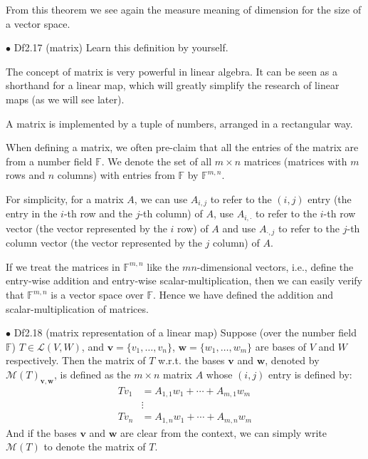 \documentclass{article}
\begin{document}
\begin{Rmk}{}
    From this theorem we see again the measure meaning of dimension for the size of a vector space.
\end{Rmk}

\begin{Df}{$\bullet$ Df2.17 (matrix)}
    Learn this definition by yourself.
\end{Df}

\begin{Rmk}{}
    \begin{compactenum}
        \item The concept of matrix is very powerful in linear algebra. It can be seen as a shorthand for a linear map, which will greatly simplify the research of linear maps (as we will see later). 
        \item A matrix is implemented by a tuple of numbers, arranged in a rectangular way.
        \item When defining a matrix, we often pre-claim that all the entries of the matrix are from a number field $\mathbb{F}$. \textcolor{Df}{We denote the set of all $m\times n$ matrices (matrices with $m$ rows and $n$ columns) with entries from $\mathbb{F}$ by $\mathbb{F}^{m,n}$.}
        \item \textcolor{Df}{For simplicity, for a matrix $A$, we can use $A_{i,j}$ to refer to the $(i,j)$ entry (the entry in the $i$-th row and the $j$-th column) of $A$, use $A_{i,\cdot}$ to refer to the $i$-th row vector (the vector represented by the $i$ row) of $A$ and use $A_{\cdot, j}$ to refer to the $j$-th column vector (the vector represented by the $j$ column) of $A$.}
        \item \textcolor{Th}{If we treat the matrices in $\mathbb{F}^{m,n}$ like the $mn$-dimensional vectors, i.e., define the entry-wise addition and entry-wise scalar-multiplication, then we can easily verify that \textcolor{Th}{$\mathbb{F}^{m,n}$ is a vector space over $\mathbb{F}$}}. \textcolor{Df}{Hence we have defined the addition and scalar-multiplication of matrices.} 
    \end{compactenum}
\end{Rmk}

\begin{Df}{$\bullet$ Df2.18 (matrix representation of a linear map)}
    Suppose (over the number field $\mathbb{F}$) $T\in\mathcal{L}(V, W)$, and $\pmb{v} = \{v_1, \dots, v_n\}$, $\pmb{w} = \{w_1, \dots, w_m\}$ are bases of $V$ and $W$ respectively. Then the matrix of $T$ w.r.t. the bases $\pmb{v}$ and $\pmb{w}$, denoted by $\mathcal{M}(T)_{\pmb{v}, \pmb{w}}$, is defined as the $m\times n$ matrix $A$ whose $(i,j)$ entry is defined by:
    $$
    \begin{aligned}
        Tv_{1}&=A_{1,1}w_{1}+\cdots+A_{m,1}w_{m}\\
        &\vdots\\
        Tv_{n}&=A_{1,n}w_{1}+\cdots+A_{m,n}w_{m}
    \end{aligned}
    $$
    And if the bases $\pmb{v}$ and $\pmb{w}$ are clear from the context, we can simply write $\mathcal{M}(T)$ to denote the matrix of $T$.
\end{Df}
\end{document}
